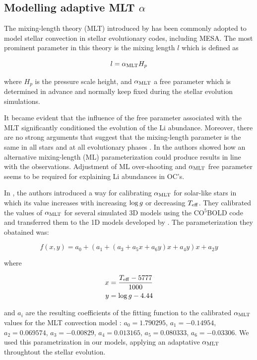 \documentclass[fleqn,usenatbib]{mnras}
\begin{document}
\subsection{Modelling adaptive MLT $\alpha$} \label{mod_mltalpha}
The mixing-length theory (MLT) introduced by \citet{BohmVit58} has been commonly adopted to model stellar convection in stellar evolutionary codes, including MESA. The most prominent parameter in this theory is the mixing length $l$ which is defined as 
\begin{ceqn}
\begin{equation}
 l = \alpha_{\mathrm{MLT}} H_p\label{eq:mixlength}
\end{equation}
\end{ceqn}
where $H_p$ is the pressure scale height, and $\alpha_{\mathrm{MLT}}$ a free parameter which is determined in advance and normally keep fixed during the stellar evolution simulations.\par

 It became evident that the influence of the free parameter associated with the MLT significantly conditioned the evolution of the Li abundance. Moreover, there are no strong arguments that suggest that the mixing-length parameter is the same in all stars and at all evolutionary phases \citep{Pasetto2014}. In \citet{Caballero2020} the authors showed how an alternative mixing-length (ML) parameterization could produce results in line with the observations. Adjustment of ML over-shooting and $\alpha_{\mathrm{MLT}}$ free parameter seems to be required for explaining Li abundances in OC's.\par

In \citet{Sonoi2018}, the authors introduced a way for calibrating $\alpha_{\mathrm{MLT}}$ for solar-like stars in which its value increases with increasing $\mathrm{log} \, g$ or decreasing $T_{\mathrm{eff}}$. They calibrated the values of $\alpha_{\mathrm{MLT}}$ for several simulated 3D models using the CO$^5$BOLD code \citep{Freytag2011} and transferred them to the 1D models developed by \citet{Ludwig1998}. The parameterization they obatained was: 

\begin{ceqn}
\begin{equation}
 f(x,y) = a_0 + (a_1 + (a_3 + a_5x +a_6y)x + a_4y)x + a_2y\label{eq:alpha_ml}
\end{equation}
\end{ceqn}
where
\begin{ceqn}
\begin{align}
     x &= \frac{T_{\mathrm{eff}}-5777}{1000} \label{eq:eq:alpha_x}\\
     y &= \mathrm{log} \, g-4.44 \label{eq:eq:alpha_y}
\end{align}
\end{ceqn}
and $a_i$ are the resulting coefficients of the fitting function to the calibrated $\alpha_{\mathrm{MLT}}$ values for the MLT convection model \citep{Sonoi2018}: $a_0=1.790295$, $a_1=-0.14954$, $a_2=0.069574$, $a_3=-0.00829$, $a_4=0.013165$, $a_5=0.080333$, $a_6=-0.03306$. We used this parametrization in our models, applying an adaptative $\alpha_{\mathrm{MLT}}$ throughtout the stellar evolution.\par
\end{document}
